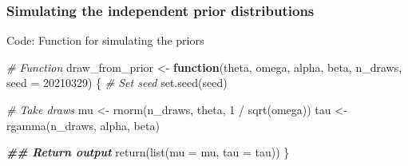 \documentclass[
  11pt,
]{article}
\newenvironment{Shaded}{\begin{snugshade}}{\end{snugshade}}
\newcommand{\AttributeTok}[1]{\textcolor[rgb]{0.77,0.63,0.00}{#1}}
\newcommand{\CommentTok}[1]{\textcolor[rgb]{0.56,0.35,0.01}{\textit{#1}}}
\newcommand{\ControlFlowTok}[1]{\textcolor[rgb]{0.13,0.29,0.53}{\textbf{#1}}}
\newcommand{\DecValTok}[1]{\textcolor[rgb]{0.00,0.00,0.81}{#1}}
\newcommand{\DocumentationTok}[1]{\textcolor[rgb]{0.56,0.35,0.01}{\textbf{\textit{#1}}}}
\newcommand{\FunctionTok}[1]{\textcolor[rgb]{0.00,0.00,0.00}{#1}}
\newcommand{\NormalTok}[1]{#1}
\newcommand{\OtherTok}[1]{\textcolor[rgb]{0.56,0.35,0.01}{#1}}
\newcommand{\SpecialCharTok}[1]{\textcolor[rgb]{0.00,0.00,0.00}{#1}}
\begin{document}
\hypertarget{simulating-the-independent-prior-distributions}{%
\subsubsection{Simulating the independent prior distributions}\label{simulating-the-independent-prior-distributions}}

Code: Function for simulating the priors

\begin{Shaded}
\begin{Highlighting}[]
\CommentTok{\# Function}
\NormalTok{draw\_from\_prior }\OtherTok{\textless{}{-}}
  \ControlFlowTok{function}\NormalTok{(theta,}
\NormalTok{           omega,}
\NormalTok{           alpha,}
\NormalTok{           beta,}
\NormalTok{           n\_draws,}
           \AttributeTok{seed =} \DecValTok{20210329}\NormalTok{) \{}
    \CommentTok{\# Set seed}
    \FunctionTok{set.seed}\NormalTok{(seed)}
    
    \CommentTok{\# Take draws}
\NormalTok{    mu }\OtherTok{\textless{}{-}} \FunctionTok{rnorm}\NormalTok{(n\_draws, theta, }\DecValTok{1} \SpecialCharTok{/} \FunctionTok{sqrt}\NormalTok{(omega))}
\NormalTok{    tau }\OtherTok{\textless{}{-}} \FunctionTok{rgamma}\NormalTok{(n\_draws, alpha, beta)}
    
    \DocumentationTok{\#\# Return output}
    \FunctionTok{return}\NormalTok{(}\FunctionTok{list}\NormalTok{(}\AttributeTok{mu =}\NormalTok{ mu,}
                \AttributeTok{tau =}\NormalTok{ tau))}
\NormalTok{  \}}
\end{Highlighting}
\end{Shaded}
\end{document}
